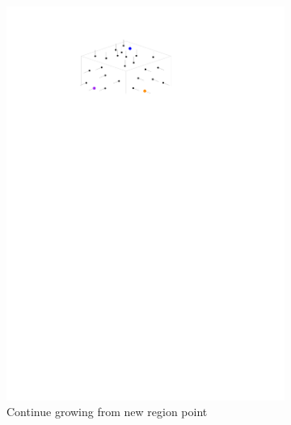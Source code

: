 \begin{figure}
\begin{subfigure}[b]{0.3\linewidth}
		\includegraphics[width=\textwidth,page=3]{region-growing.pdf}
		\caption{Continue growing from new region point}\label{fig:region-growing:c}
	\end{subfigure}
	\begin{subfigure}[b]{0.3\linewidth}
		\centering

\end{subfigure}
\end{figure}
